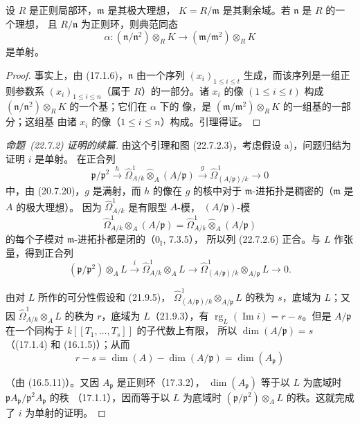 \begin{lemma}[22.7.2.4]
\label{0.22.7.2.4-fr}
设 $R$ 是正则局部环，$\mathfrak m$ 是其极大理想，
$K=R/\mathfrak m$ 是其剩余域。若 $\mathfrak n$ 是 $R$ 的一个理想，
且 $R/\mathfrak n$ 为正则环，则典范同态
\begin{equation}
\label{0.22.7.2.5-fr}
  \alpha:(\mathfrak n/\mathfrak n^2)\otimes_RK
  \longrightarrow(\mathfrak m/\mathfrak m^2)\otimes_RK
  \tag{22.7.2.5}
\end{equation}
是单射。
\end{lemma}

\begin{proof}
事实上，由 (17.1.6)，$\mathfrak n$ 由一个序列
$(x_i)_{1\leq i\leq t}$ 生成，而该序列是一组正则参数系
$(x_i)_{1\leq i\leq n}$（属于 $R$）的一部分。诸 $x_i$ 的像
$(1\leq i\leq t)$ 构成
$(\mathfrak n/\mathfrak n^2)\otimes_RK$ 的一个基；它们在 $\alpha$ 下的
像，是 $(\mathfrak m/\mathfrak m^2)\otimes_RK$ 的一组基的一部分；这组基
由诸 $x_i$ 的像（$1\leq i\leq n$）构成。引理得证。
\end{proof}

\begin{proof}[命题~{\rm(22.7.2)} 证明的续篇]
由这个引理和图 (22.7.2.3)，考虑假设 a)，问题归结为证明 $i$ 是单射。
在正合列
\begin{equation}
\label{0.22.7.2.6-fr}
  \mathfrak p/\mathfrak p^2\xrightarrow{h}
  \widehat\Omega^1_{A/k}\widehat\otimes_A(A/\mathfrak p)
  \xrightarrow{g}\widehat\Omega^1_{(A/\mathfrak p)/k}\longrightarrow0
  \tag{22.7.2.6}
\end{equation}
中，由 (20.7.20)，$g$ 是满射，而 $h$ 的像在 $g$ 的核中对于
$\mathfrak m$-进拓扑是稠密的（$\mathfrak m$ 是 $A$ 的极大理想）。
因为 $\widehat\Omega^1_{A/k}$ 是有限型 $A$-模，
$(A/\mathfrak p)$-模
\[
  \widehat\Omega^1_{A/k}\otimes_A(A/\mathfrak p)
  =\widehat\Omega^1_{A/k}\widehat\otimes_A(A/\mathfrak p)
\]
的每个子模对 $\mathfrak m$-进拓扑都是闭的（$0_{\mathrm I}$, 7.3.5），
所以列 (22.7.2.6) 正合。与 $L$ 作张量，得到正合列
\[
  (\mathfrak p/\mathfrak p^2)\otimes_AL\xrightarrow{i}
  \widehat\Omega^1_{A/k}\otimes_AL\longrightarrow
  \widehat\Omega^1_{(A/\mathfrak p)/k}\otimes_{A/\mathfrak p}L
  \longrightarrow0.
\]

由对 $L$ 所作的可分性假设和 (21.9.5)，
$\widehat\Omega^1_{(A/\mathfrak p)/k}\otimes_{A/\mathfrak p}L$ 的秩为
$s$，底域为 $L$；又因 $\widehat\Omega^1_{A/k}\otimes_AL$ 的秩为
$r$，底域为 $L$（21.9.3），有 $\operatorname{rg}_L(\operatorname{Im}i)=r-s$。但是
$A/\mathfrak p$ 在一个同构于 $k[[T_1,\ldots,T_s]]$ 的子代数上有限，
所以 $\dim(A/\mathfrak p)=s$（(17.1.4) 和 (16.1.5)）；从而
\[
  r-s=\dim(A)-\dim(A/\mathfrak p)=\dim(A_{\mathfrak p})
\]


（由 (16.5.11)）。又因 $A_{\mathfrak p}$ 是正则环（17.3.2），
$\dim(A_{\mathfrak p})$ 等于以 $L$ 为底域时
$\mathfrak pA_{\mathfrak p}/\mathfrak p^2A_{\mathfrak p}$ 的秩
（17.1.1），因而等于以 $L$ 为底域时
$(\mathfrak p/\mathfrak p^2)\otimes_AL$ 的秩。这就完成了
$i$ 为单射的证明。
\end{proof}

